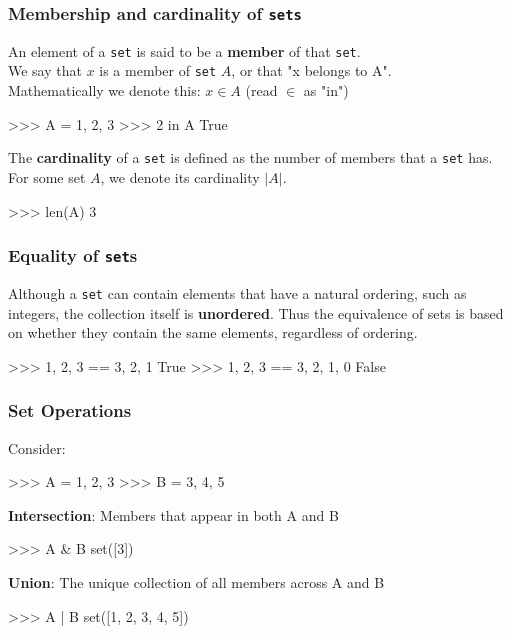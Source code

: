 \documentclass{beamer}
\begin{document}
\begin{frame}[fragile]
\frametitle{Membership and cardinality of \texttt{sets}}
An element of a \texttt{set} is said to be a \textbf{member} of that \texttt{set}.\\
    We say that $x$ is a member of \texttt{set} $A$, or that
    "x belongs to A".\\
    Mathematically we denote this: $x \in A$ (read $\in$ as "in")\\
\begin{code}
>>> A = {1, 2, 3}
>>> 2 in A
True
\end{code}

\bigskip
    The \textbf{cardinality} of a \texttt{set} is defined as the number of members that a \texttt{set} has.
    For some set $A$, we denote its cardinality $|A|$.\\
\begin{code}
>>> len(A)
3
\end{code}
\end{frame}

\begin{frame}[fragile]
\frametitle{Equality of \texttt{set}s}
Although a \texttt{set} can contain elements that have a natural ordering, such as
integers, the collection itself is \textbf{unordered}. Thus the equivalence of sets
is based on whether they contain the same elements, regardless of ordering.
\begin{code}
>>> {1, 2, 3} == {3, 2, 1}
True
>>> {1, 2, 3} == {3, 2, 1, 0}
False
\end{code}
\end{frame}


\begin{frame}[fragile]
\frametitle{Set Operations}
Consider:
\begin{code}
>>> A = {1, 2, 3}
>>> B = {3, 4, 5}
\end{code}

\vskip 0.4cm
\textbf{Intersection}: Members that appear in both A and B
\begin{code}
>>> A & B
set([3])
\end{code}

\vskip 0.4cm
\textbf{Union}: The unique collection of all members across A and B
\begin{code}
>>> A | B
set([1, 2, 3, 4, 5])
\end{code}
\end{frame}
\end{document}
